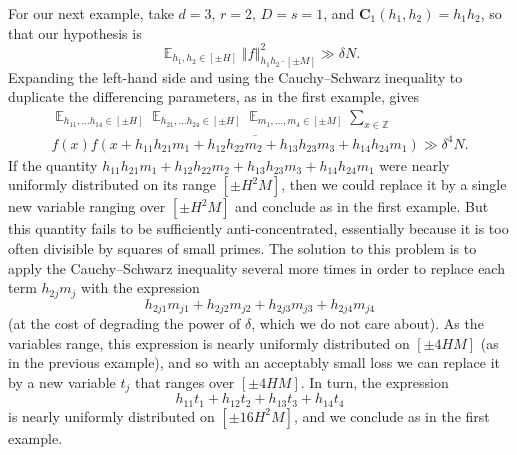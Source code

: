 \documentclass[11pt]{amsart}
\theoremstyle{definition}
\DeclareMathOperator*{\E}{\mathbb{E}}
\newcommand{\bc}{{\mathbf{C}}}
\newcommand{\norm}[1]{\left\Vert #1\right\Vert}
\begin{document}
For our next example, take $d=3$, $r=2$, $D=s=1$, and $\bc_1(h_1,h_2)=h_1h_2$, so that our hypothesis is
$$\E_{h_1,h_2 \in [\pm H]} \norm{f}^2_{h_1h_2 \cdot [\pm M]} \gg \delta N.$$
Expanding the left-hand side and using the Cauchy--Schwarz inequality to duplicate the differencing parameters, as in the first example, gives
\begin{multline*}
\E_{h_{11},\ldots h_{14} \in [\pm H]}\E_{h_{21},\ldots h_{24} \in [\pm H]}\E_{m_1,\ldots,m_4 \in [\pm M]}\sum_{x \in \mathbb{Z}}\\
f(x)\overline{f(x+h_{11}h_{21}m_1+h_{12}h_{22}m_2+h_{13}h_{23}m_3+h_{14}h_{24}m_1)} \gg \delta^4 N.
\end{multline*}
If the quantity $h_{11}h_{21}m_1+h_{12}h_{22}m_2+h_{13}h_{23}m_3+h_{14}h_{24}m_1$ were nearly uniformly distributed on its range $[\pm H^2M]$, then we could replace it by a single new variable ranging over $[\pm H^2M]$ and conclude as in the first example.  But this quantity fails to be sufficiently anti-concentrated, essentially because it is too often divisible by squares of small primes.  The solution to this problem is to apply the Cauchy--Schwarz inequality several more times in order to replace each term $h_{2j}m_j$ with the expression
$$h_{2j1}m_{j1}+h_{2j2}m_{j2}+h_{2j3}m_{j3}+h_{2j4}m_{j4}$$
(at the cost of degrading the power of $\delta$, which we do not care about).  As the variables range, this expression is nearly uniformly distributed on $[\pm 4HM]$ (as in the previous example), and so with an acceptably small loss we can replace it by a new variable $t_j$ that ranges over $[\pm 4HM]$.  In turn, the expression
$$h_{11}t_1+h_{12}t_2+h_{13}t_3+h_{14}t_4$$
is nearly uniformly distributed on $[\pm 16 H^2M]$, and we conclude as in the first example.
\end{document}

